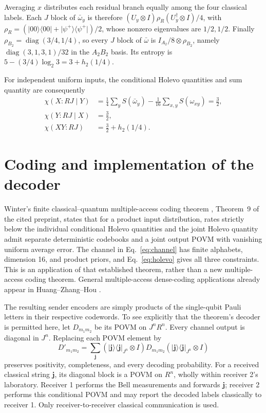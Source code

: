 \documentclass[11pt]{article}
\newcommand{\ket}[1]{\lvert #1\rangle}
\newcommand{\bra}[1]{\langle #1\rvert}
\newcommand{\proj}[1]{\ket{#1}\!\bra{#1}}
\newcommand{\hbin}{h_2}
\begin{document}
Averaging $x$ distributes each residual branch equally among the four
classical labels. Each $J$ block of $\bar\omega_y$ is therefore
$(U_y\otimes I)\rho_R(U_y^\dagger\otimes I)/4$, with
$\rho_R=(\proj{00}+\proj{\psi^+})/2$, whose nonzero eigenvalues are $1/2,1/2$.
Finally $\rho_{B_2}=\operatorname{diag}(3/4,1/4)$, so every $J$ block of
$\bar\omega$ is $I_{A_2}/8\otimes\rho_{B_2}$, namely
$\operatorname{diag}(3,1,3,1)/32$ in the $A_2B_2$ basis.
Its entropy is $5-(3/4)\log_2 3=3+\hbin(1/4)$.

For independent uniform inputs, the conditional Holevo quantities and sum
quantity are consequently
\begin{align}\label{eq:holevo}
 \chi(X:R J\mid Y)&=\tfrac14\sum_y S(\bar\omega_y)
                      -\tfrac1{16}\sum_{x,y}S(\omega_{xy})=\tfrac32,\nonumber\\
 \chi(Y:R J\mid X)&=\tfrac32,\nonumber\\
 \chi(XY:R J)&=\tfrac32+\hbin(1/4).
\end{align}

\section{Coding and implementation of the decoder}
Winter's finite classical--quantum multiple-access coding theorem
\cite{winter}, Theorem~9 of the cited preprint, states that for a product
input distribution, rates strictly below the individual conditional Holevo
quantities and the joint Holevo quantity admit separate deterministic
codebooks and a joint output POVM with vanishing uniform average error.
The channel in Eq.~\eqref{eq:channel} has finite alphabets, dimension 16,
and product priors, and Eq.~\eqref{eq:holevo} gives all three constraints.
This is an application of that established theorem, rather than a new
multiple-access coding theorem. General multiple-access dense-coding
applications already appear in Huang--Zhang--Hou \cite{huang}.

The resulting sender encoders are simply products of the single-qubit Pauli
letters in their respective codewords. To see explicitly that the theorem's
decoder is permitted here, let $D_{m_1m_2}$ be its POVM on $J^nR^n$.
Every channel output is diagonal in $J^n$. Replacing each POVM element by
\[
 D'_{m_1m_2}=\sum_{\mathbf j}
  (\proj{\mathbf j}_{J^n}\otimes I)D_{m_1m_2}
  (\proj{\mathbf j}_{J^n}\otimes I)
\]
preserves positivity, completeness, and every decoding probability. For a
received classical string $\mathbf j$, its diagonal block is a POVM on
$R^n$, wholly within receiver 2's laboratory. Receiver 1 performs the Bell
measurements and forwards $\mathbf j$; receiver 2 performs this conditional
POVM and may report the decoded labels classically to receiver 1.
Only receiver-to-receiver classical communication is used.
\end{document}
